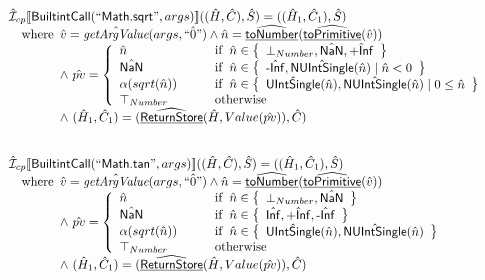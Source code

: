 \[\begin{array}{l}
\aI _{cp}\lbr \SF{BuiltintCall}(``\SF{Math.sqrt}",args)\rbr((\hat{H},\hat{C}), \hat{S})
  = ((\hat{H}_1, \hat{C}_1), \hat{S})\\
\quad\wherec{
  \hat{v}=\hat{\hf{getArgValue}}(args, \hat{``0"}) \land \hat{n}=\ahf{toNumber}(\ahf{toPrimitive}(\hat{v}))\\
  \land\ \hat{pv}   = 
  \left\{
    \begin{array}{l@{\quad\quad\quad}l}
      \hat{n} & \ifc{\hat{n} \in \set{\bot_{Number}, \hat{\SF{NaN}}, \hat{\SF{+Inf}}}}\\
      \hat{\SF{NaN}} & \ifc{\hat{n} \in \set{\hat{\SF{-Inf}}, \hat{\SF{NUIntSingle}}(\hat{n}) \mid \hat{n}<0}}\\
      \alpha(sqrt(\hat{n})) & \ifc{\hat{n} \in \set{\hat{\SF{UIntSingle}}(\hat{n}), \hat{\SF{NUIntSingle}}(\hat{n}) \mid 0\leq\hat{n}}}\\
      \top_{Number} & \owc\\
    \end{array}
  \right.\\
  \land\ (\hat{H}_1, \hat{C}_1) = (\ahf{ReturnStore}(\hat{H}, Value(\hat{pv})), \hat{C})
  }\\
\\\\



\aI _{cp}\lbr \SF{BuiltintCall}(``\SF{Math.tan}",args)\rbr((\hat{H},\hat{C}), \hat{S})
  = ((\hat{H}_1, \hat{C}_1), \hat{S})\\
\quad\wherec{
  \hat{v}=\hat{\hf{getArgValue}}(args, \hat{``0"}) \land \hat{n}=\ahf{toNumber}(\ahf{toPrimitive}(\hat{v}))\\
  \land\ \hat{pv}   = 
  \left\{
    \begin{array}{l@{\quad\quad\quad}l}
      \hat{n} & \ifc{\hat{n} \in \set{\bot_{Number}, \hat{\SF{NaN}}}}\\
      \hat{\SF{NaN}} & \ifc{\hat{n} \in \set{\hat{\SF{Inf}}, \hat{\SF{+Inf}}, \hat{\SF{-Inf}}}}\\
      \alpha(sqrt(\hat{n})) & \ifc{\hat{n} \in \set{\hat{\SF{UIntSingle}}(\hat{n}), \hat{\SF{NUIntSingle}}(\hat{n})}}\\
      \top_{Number} & \owc\\
    \end{array}
  \right.\\
  \land\ (\hat{H}_1, \hat{C}_1) = (\ahf{ReturnStore}(\hat{H}, Value(\hat{pv})), \hat{C})
  }\\
\\\\


\end{array}
\]


